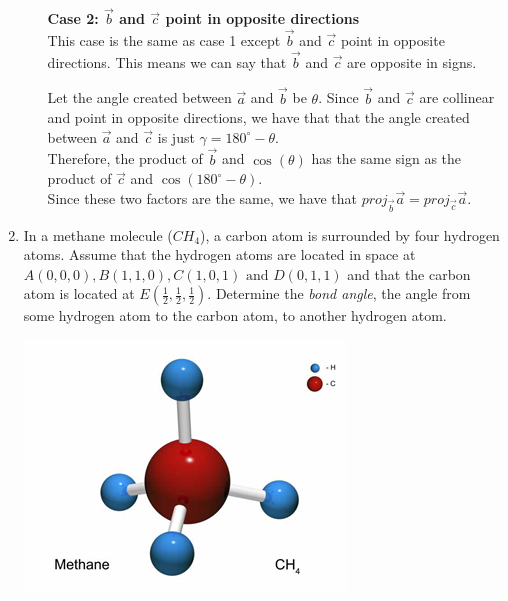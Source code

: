 \documentclass[12pt]{book}
\begin{document}
\begin{enumerate}
\begin{enumerate}
\textbf{Case 2: $\vec{b}$ and $\vec{c}$ point in opposite directions}\\
This case is the same as case 1 except $\vec{b}$ and $\vec{c}$ point in opposite directions. This means we can say that $\vec{b}$ and $\vec{c}$ are opposite in signs.\

Let the angle created between $\vec{a}$ and $\vec{b}$ be $\theta$. Since $\vec{b}$ and $\vec{c}$ are collinear and point in opposite directions, we have that that the angle created between $\vec{a}$ and $\vec{c}$ is just $\gamma = 180^{\circ}-\theta$.\\
Therefore, the product of $\vec{b}$ and $\cos(\theta)$ has the same sign as the product of $\vec{c}$ and $\cos\left(180^{\circ} - \theta\right)$.\\

Since these two factors are the same, we have that $proj_{\vec{b}}\vec{a} = proj_{\vec{c}}\vec{a}$.


\end{enumerate}

\newpage

\item In a methane molecule ($CH_4$), a carbon atom is surrounded by four hydrogen atoms. Assume that the hydrogen atoms are located in space at $A(0,0,0), B(1,1,0), C(1,0,1) \textrm{ and } D(0,1,1)$ and that the carbon atom is located at $E\left(\frac{1}{2},\frac{1}{2},\frac{1}{2}\right)$. Determine the \emph{bond angle}, the angle from some hydrogen atom to the carbon atom, to another hydrogen atom.

\includegraphics[scale=2]{Methane.png}


\end{enumerate}
\end{document}
